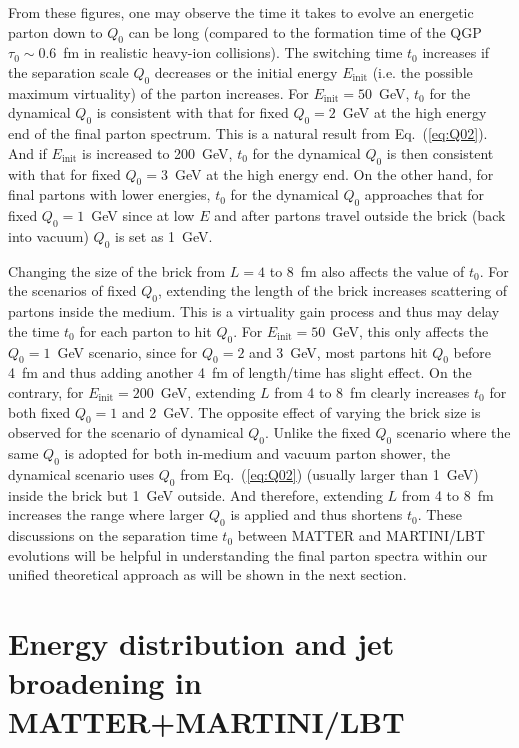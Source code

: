 \documentclass[aps,prc,twocolumn,floatfix,superscriptaddress,nofootinbib]{revtex4}
\begin{document}
From these figures, one may observe the time it takes to evolve an energetic parton down to $Q_0$ can be long (compared to the formation time of the QGP $\tau_0\sim0.6$~fm in realistic heavy-ion collisions). The switching time $t_0$ increases if the separation scale $Q_0$ decreases or the initial energy $E_\mathrm{init}$ (i.e. the possible maximum virtuality) of the parton increases. For $E_\mathrm{init}=50$~GeV, $t_0$ for the dynamical $Q_0$ is consistent with that for fixed $Q_0=2$~GeV at the high energy end of the final parton spectrum. This is a natural result from Eq.~(\ref{eq:Q02}). And if $E_\mathrm{init}$ is increased to 200~GeV, $t_0$ for the dynamical $Q_0$ is then consistent with that for fixed $Q_0=3$~GeV at the high energy end. On the other hand, for final partons with lower energies, $t_0$ for the dynamical $Q_0$ approaches that for fixed $Q_0=1$~GeV since at low $E$ and after partons travel outside the brick (back into vacuum) $Q_0$ is set as 1~GeV. 

Changing the size of the brick from $L=4$ to 8~fm also affects the value of $t_0$. For the scenarios of fixed $Q_0$, extending the length of the brick increases scattering of partons inside the medium. This is a virtuality gain process and thus may delay the time $t_0$ for each parton to hit $Q_0$. For $E_\mathrm{init}=50$~GeV, this only affects the $Q_0=1$~GeV scenario, since for $Q_0=2$ and 3~GeV, most partons hit $Q_0$ before 4~fm and thus adding another 4~fm of length/time has slight effect. On the contrary, for $E_\mathrm{init}=200$~GeV, extending $L$ from 4 to 8~fm clearly increases $t_0$ for both fixed $Q_0=1$ and 2~GeV. The opposite effect of varying the brick size is observed for the scenario of dynamical $Q_0$. Unlike the fixed $Q_0$ scenario where the same $Q_0$ is adopted for both in-medium and vacuum parton shower, the dynamical scenario uses $Q_0$ from Eq.~(\ref{eq:Q02}) (usually larger than 1~GeV) inside the brick but 1~GeV outside. And therefore, extending $L$ from 4 to 8~fm increases the range where larger $Q_0$ is applied and thus shortens $t_0$. These discussions on the separation time $t_0$ between MATTER and MARTINI/LBT evolutions will be helpful in understanding the final parton spectra within our unified theoretical approach as will be shown in the next section.


\section{Energy distribution and jet broadening in MATTER+MARTINI/LBT}
\label{sec:results}
\end{document}
